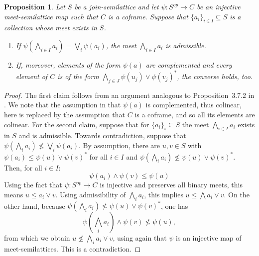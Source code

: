 \documentclass[11pt,a4paper,reqno]{amsart}
\newcommand{\tbigwedge}{\mathop{\textstyle \bigwedge }}%
\newcommand{\tbigvee}{\mathop{\textstyle \bigvee }}%
\newtheorem{proposition}[theorem]{Proposition}
\theoremstyle{definition}
\theoremstyle{remark}
\newcommand{\we}{\wedge}
\newcommand{\ve}{\vee}
\begin{document}
{


\begin{proposition}\label{p: exact iff preserved by psi}
    Let $S$ be a join-semilattice and let $\psi:S^{op}\to C$ be an injective meet-semilattice map such that $C$ is a coframe. Suppose that $\{a_i\}_{i\in I}\subseteq S$ is a collection whose meet exists in $S$.
    \begin{enumerate}
        \item If $\psi(\tbigwedge_{i\in I} a_i)=\tbigvee_i \psi(a_i)$, the meet $\tbigwedge_{i\in I} a_i$ is admissible.
        \item  \label{with complements generates}If, moreover, elements of the form $\psi(a)$ are complemented and every element of $C$ is of the form $\tbigwedge_{j\in J} \psi(u_j)\vee \psi(v_j)^*$, the converse holds, too.
    \end{enumerate}
\end{proposition}
\begin{proof}
The first claim follows from an argument analogous to Proposition~3.7.2 in \cite{moshier22}. We note that the assumption in \cite{moshier22} that $\psi(a)$ is complemented, thus colinear, here is replaced by the assumption that $C$ is a coframe, and so all its elements are colinear. For the second claim, suppose that for $\{a_i\}_i\subseteq S$ the meet $\tbigwedge_{i\in I} a_i$ exists in $S$ and is admissible. Towards contradiction, suppose that $\psi(\tbigwedge_i a_i)\nleq \tbigvee_i \psi(a_i)$. By assumption, there are $u,v\in S$ with $\psi(a_i)\leq \psi(u)\vee \psi(v)^*$ for all $i\in I$ and $\psi(\tbigwedge_i a_i)\nleq \psi(u)\vee \psi(v)^*$. Then, for all $i\in I$:
\[
\psi(a_i)\we \psi(v)\leq \psi(u)
\]
Using the fact that $\psi:S^{op}\to C$ is injective and preserves all binary meets, this means $u\leq a_i \vee v$. Using admissibility of $\tbigwedge_i a_i$, this implies $u\leq \tbigwedge a_i \vee v$. On the other hand, because $\psi(\tbigwedge_i a_i)\nleq \psi(u)\vee \psi(v)^*$, one has
\[
\psi(\tbigwedge_i a_i)\we \psi(v)\nleq \psi(u),
\]
from which we obtain $u\nleq \tbigwedge_i a_i \ve v$, using again that $\psi$ is an injective map of meet-semilattices. This is a contradiction.
\end{proof}

}
\end{document}
